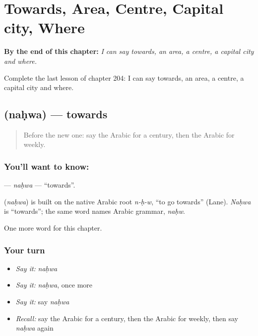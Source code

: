 
\chapter{Towards, Area, Centre, Capital city, Where}
\label{ch:ar-towards-area-centre-capital-city-where}

\begin{chapteropening}
\textbf{By the end of this chapter:} \emph{I can say towards, an area, a centre, a capital city and where.}

Complete the last lesson of chapter 204: I can say towards, an area, a centre, a capital city and where.
\end{chapteropening}

\section[\texorpdfstring{\ar{نحو} (naḥwa)}{نحو (naḥwa)}]{ (naḥwa) — towards}

\label{lesson:AR-C204-nahwa}



\begin{quote}
Before the new one: say the Arabic for a century, then the Arabic for weekly.
\end{quote}

\subsection*{You'll want to know: }
\textbf{} — \emph{naḥwa} — \textquotedblleft{}towards\textquotedblright{}.

\begin{cousinweb}
\textbf{} (\emph{naḥwa}) is built on the native Arabic root \emph{n-ḥ-w}, \textquotedblleft{}to go towards\textquotedblright{} (Lane). \emph{Naḥwa} is \textquotedblleft{}towards\textquotedblright{}; the same word names Arabic grammar, \emph{naḥw}.
\end{cousinweb}

\begin{grammarlens}[title={What you've built}]
One more word for this chapter.
\end{grammarlens}

\subsection*{Your turn}
\begin{itemize}
\raggedright
  \item \emph{Say it:} \emph{naḥwa}
  \item \emph{Say it:} \emph{naḥwa}, once more
  \item \emph{Say it:} say \emph{naḥwa}
  \item \emph{Recall:} say the Arabic for a century, then the Arabic for weekly, then say \emph{naḥwa} again
\end{itemize}

